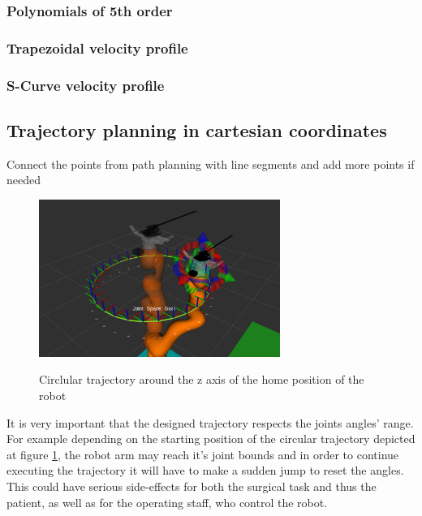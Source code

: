 \subsubsection{Polynomials of 5th order}


\subsubsection{Trapezoidal velocity profile}


\subsubsection{S-Curve velocity profile}


\subsection{Trajectory planning in cartesian coordinates}

Connect the points from path planning with line segments and add more points if needed

\begin{center}
\begin{figure}[H]
\centering
\includegraphics[width=0.7\textwidth]{images/simple_circular_traj1.png}\\
\caption{Circlular trajectory around the z axis of the home position of the robot}
\label{fig:circ-traj-out-of-angle-range}
\end{figure}
\end{center}

It is very important that the designed trajectory respects the joints angles' range. For example
depending on the starting position of the circular trajectory depicted at figure 
\ref{fig:circ-traj-out-of-angle-range}, the robot arm may reach it's joint bounds and in order to 
continue executing the trajectory it will have to make a sudden jump to reset the angles. 
This could have serious side-effects for both the surgical task and thus the patient, as well as 
for the operating staff, who control the robot.